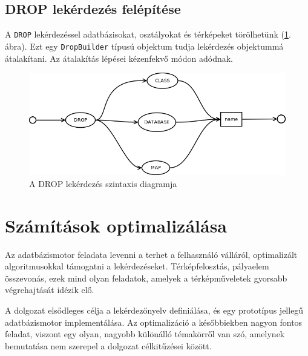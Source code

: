 \subsection{DROP lekérdezés felépítése}

A \texttt{DROP} lekérdezéssel adatbázisokat, osztályokat és térképeket törölhetünk (\ref{fig:dropSytnax}. ábra). Ezt egy \texttt{DropBuilder} típusú objektum tudja lekérdezés objektummá átalakítani. Az átalakítás lépései kézenfekvő módon adódnak.

\begin{figure}[htb]
	\begin{center}
		\includegraphics[scale=0.4]{images/drop}
		\caption{A DROP lekérdezés szintaxis diagramja}
		\label{fig:dropSytnax}
	\end{center}
\end{figure}

\section{Számítások optimalizálása}

Az adatbázismotor feladata levenni a terhet a felhasználó válláról,  optimalizált algoritmusokkal támogatni a lekérdezéseket. Térképfelosztás, pályaelem összevonás, ezek mind olyan feladatok, amelyek a térképműveletek gyorsabb végrehajtását idézik elő.

A dolgozat elsődleges célja a lekérdezőnyelv definiálása, és egy prototípus jellegű adatbázismotor implementálása. Az optimalizáció a későbbiekben nagyon fontos feladat, viszont egy olyan, nagyobb különálló témakörről van szó, amelynek bemutatása nem szerepel a dolgozat célkitűzései között.
